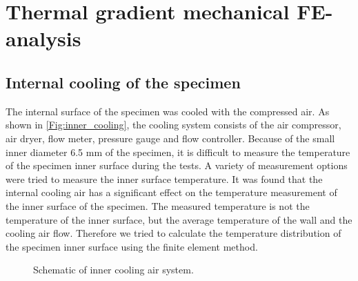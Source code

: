 \documentclass[preprint,5p,twocolumn,11pt,sort&compress]{elsarticle}
\begin{document}
\section{Thermal gradient mechanical FE-analysis}

\subsection{Internal cooling of the specimen}
\noindent
The internal surface of the specimen was cooled with the compressed air. As shown in \autoref{Fig:inner_cooling}, the cooling system consists of the air compressor, air dryer, flow meter, pressure gauge and flow controller.
Because of the small inner diameter 6.5 mm of the specimen, it is difficult to measure the temperature of the specimen inner surface during the tests.
A variety of measurement options were tried to measure the inner surface temperature.
It was found that the internal cooling air has a significant effect on the temperature measurement of the inner surface of the specimen.
The measured temperature is not the temperature of the inner surface, but the average temperature of the wall and the cooling air flow.
Therefore we tried to calculate the temperature distribution of the specimen inner surface using the finite element method.

\begin{figure}[!htp]
\caption{Schematic of inner cooling air system.}
\label{Fig:inner_cooling}
\end{figure}
\end{document}
